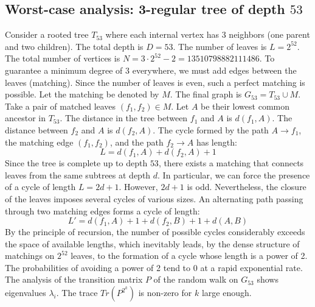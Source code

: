 \documentclass[11pt,a4paper]{article}
\begin{document}
\subsection{Worst-case analysis: 3-regular tree of depth $53$}
Consider a rooted tree $T_{53}$ where each internal vertex has 3 neighbors (one parent and two children).
The total depth is $D = 53$.
The number of leaves is $L = 2^{52}$.
The total number of vertices is $N = 3 \cdot 2^{52} - 2 = 13510798882111486$.
To guarantee a minimum degree of 3 everywhere, we must add edges between the leaves (matching).
Since the number of leaves is even, such a perfect matching is possible.
Let the matching be denoted by $M$. The final graph is $G_{53} = T_{53} \cup M$.
Take a pair of matched leaves $(f_1, f_2) \in M$.
Let $A$ be their lowest common ancestor in $T_{53}$.
The distance in the tree between $f_1$ and $A$ is $d(f_1, A)$.
The distance between $f_2$ and $A$ is $d(f_2, A)$.
The cycle formed by the path $A \to f_1$, the matching edge $(f_1, f_2)$, and the path $f_2 \to A$ has length:
$$ L = d(f_1, A) + d(f_2, A) + 1 $$
Since the tree is complete up to depth $53$, there exists a matching that connects leaves from the same subtrees at depth $d$.
In particular, we can force the presence of a cycle of length $L = 2d + 1$. However, $2d+1$ is odd.
Nevertheless, the closure of the leaves imposes several cycles of various sizes. An alternating path passing through two matching edges forms a cycle of length:
$$ L' = d(f_1, A) + 1 + d(f_2, B) + 1 + d(A, B) $$
By the principle of recursion, the number of possible cycles considerably exceeds the space of available lengths, which inevitably leads, by the dense structure of matchings on $2^{52}$ leaves, to the formation of a cycle whose length is a power of 2. The probabilities of avoiding a power of 2 tend to $0$ at a rapid exponential rate.
The analysis of the transition matrix $P$ of the random walk on $G_{53}$ shows eigenvalues $\lambda_i$. The trace $Tr(P^{2^k})$ is non-zero for $k$ large enough.
\end{document}
